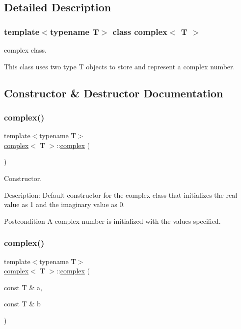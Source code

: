 \subsection{Detailed Description}
\subsubsection*{template$<$typename T$>$\newline
class complex$<$ T $>$}

complex class. 

This class uses two type T objects to store and represent a complex number. 

\subsection{Constructor \& Destructor Documentation}
\mbox{\label{classcomplex_a9752049742449cbc9571cd8f183f72b2}} 
\subsubsection{\texorpdfstring{complex()}{complex()}\hspace{0.1cm}{\footnotesize\ttfamily [1/3]}}
{\footnotesize\ttfamily template$<$typename T$>$ \\
\hyperlink{classcomplex}{complex}$<$ T $>$\+::\hyperlink{classcomplex}{complex} (\begin{DoxyParamCaption}{ }\end{DoxyParamCaption})\hspace{0.3cm}{\ttfamily [inline]}}



Constructor. 

Description\+: Default constructor for the complex class that initializes the real value as 1 and the imaginary value as 0. \begin{DoxyPostcond}{Postcondition}
A complex number is initialized with the values specified. 
\end{DoxyPostcond}
\mbox{\label{classcomplex_a27a5d75c2060b32de98ae4666fd691d1}} 
\subsubsection{\texorpdfstring{complex()}{complex()}\hspace{0.1cm}{\footnotesize\ttfamily [2/3]}}
{\footnotesize\ttfamily template$<$typename T$>$ \\
\hyperlink{classcomplex}{complex}$<$ T $>$\+::\hyperlink{classcomplex}{complex} (\begin{DoxyParamCaption}\item[{const T \&}]{a,  }\item[{const T \&}]{b }\end{DoxyParamCaption})\hspace{0.3cm}{\ttfamily [inline]}}



